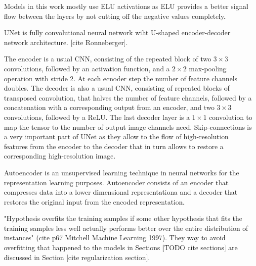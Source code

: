 Models in this work mostly use ELU activations as ELU provides a better signal flow between the layers by not cutting off the negative values completely.

\begin{definition}[UNet]
	UNet is fully convolutional neural network wiht U-shaped encoder-decoder network architecture. [cite Ronneberger].
\end{definition}

The encoder is a usual CNN, consisting of the repeated
block of two $3 \times 3$ convolutions, followed by
an activation function, and a $2 \times 2$ max-pooling operation with stride 2. At each ecnoder step  the number of feature channels doubles. The decoder is also a usual CNN, consisting of repeated blocks of transposed convolution, that halves the
number of feature channels, followed by a concatenation with a corresponding output from an encoder, and two $3 \times 3$ convolutions, followed by a ReLU. The last decoder layer is a $1 \times 1$ convolution to map the tensor to the number of output image channels need. Skip-connections is a very important part of UNet as they allow to the flow of high-resolution features from the encoder to the decoder that in turn allows to restore a corresponding high-resolution image.

\begin{definition}[Autoencoder]
	Autoencoder is an unsupervised learning technique in neural networks for the representation learning purposes. Autoencoder consists of an encoder that compresses data into a lower dimensional representationa and a decoder that restores the original input from the encoded representation.
\end{definition}

\begin{definition}[Overfitting]
    "Hypothesis overfits the training samples if some other hypothesis that fits the training samples less well actually performs better over the entire distribution of instances" (cite p67 Mitchell Machine Learning 1997). They way to avoid overfitting that happened to the models in Sections [TODO cite sections] are discussed in Section [cite regularization section].
\end{definition}
